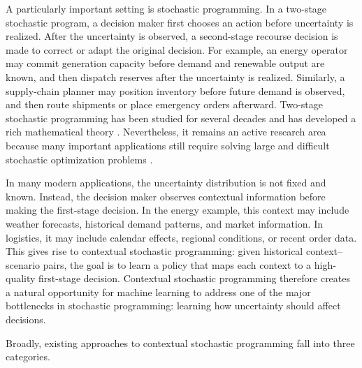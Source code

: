 A particularly important setting is stochastic programming. In a two-stage stochastic program, a decision maker first chooses an action before uncertainty is realized. After the uncertainty is observed, a second-stage recourse decision is made to correct or adapt the original decision. For example, an energy operator may commit generation capacity before demand and renewable output are known, and then dispatch reserves after the uncertainty is realized. Similarly, a supply-chain planner may position inventory before future demand is observed, and then route shipments or place emergency orders afterward. Two-stage stochastic programming has been studied for several decades and has developed a rich mathematical theory \citep{placeholder_stochastic_programming_textbook,placeholder_two_stage_sp_survey}. Nevertheless, it remains an active research area because many important applications still require solving large and difficult stochastic optimization problems \citep{placeholder_modern_sp_applications}.

In many modern applications, the uncertainty distribution is not fixed and known. Instead, the decision maker observes contextual information before making the first-stage decision. In the energy example, this context may include weather forecasts, historical demand patterns, and market information. In logistics, it may include calendar effects, regional conditions, or recent order data. This gives rise to contextual stochastic programming: given historical context--scenario pairs, the goal is to learn a policy that maps each context to a high-quality first-stage decision. Contextual stochastic programming therefore creates a natural opportunity for machine learning to address one of the major bottlenecks in stochastic programming: learning how uncertainty should affect decisions.

Broadly, existing approaches to contextual stochastic programming fall into three categories.

